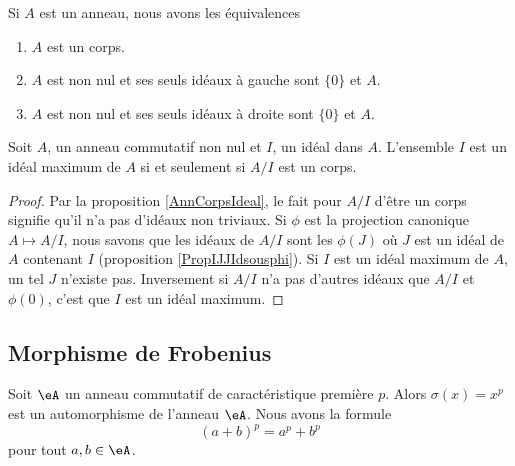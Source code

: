 \begin{proposition}     \label{AnnCorpsIdeal}
    Si \( A\) est un anneau, nous avons les équivalences
    \begin{enumerate}
        \item
            \( A\) est un corps.
        \item
            \( A\) est non nul et ses seuls idéaux à gauche sont \( \{ 0 \}\) et \( A\).
        \item
            \( A\) est non nul et ses seuls idéaux à droite sont \( \{ 0 \}\) et \( A\).
    \end{enumerate}
\end{proposition}

\begin{proposition}
    Soit \( A\), un anneau commutatif non nul et \( I\), un idéal dans \( A\). L'ensemble \( I\) est un idéal maximum de \( A\) si et seulement si \( A/I\) est un corps.
\end{proposition}

\begin{proof}
    Par la proposition \ref{AnnCorpsIdeal}, le fait pour \( A/I\) d'être un corps signifie qu'il n'a pas d'idéaux non triviaux. Si \( \phi\) est la projection canonique \( A\mapsto A/I\), nous savons que les idéaux de \( A/I\) sont les \( \phi(J)\) où \( J\) est un idéal de \( A\) contenant \( I\) (proposition \ref{PropIJJIdsousphi}). Si \( I\) est un idéal maximum de \( A\), un tel \( J\) n'existe pas. Inversement si \( A/I\) n'a pas d'autres idéaux que \( A/I\) et \( \phi(0)\), c'est que \( I\) est un idéal maximum.
\end{proof}

\subsection{Morphisme de Frobenius}

\begin{proposition}     \label{Propqrrdem}
    Soit \( \eA\) un anneau commutatif de caractéristique première \( p\). Alors \( \sigma(x)=x^p\) est un automorphisme de l'anneau \( \eA\). Nous avons la formule
    \begin{equation}
        (a+b)^p=a^p+b^p
    \end{equation}
    pour tout \( a,b\in \eA\).
\end{proposition}

